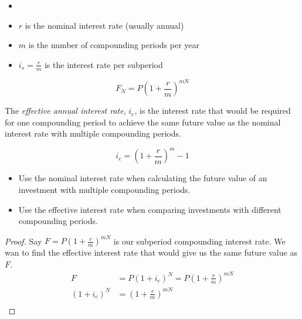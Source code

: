\begin{vocabulary}
    \begin{itemize}
        \item[]
        \item $r$ is the nominal interest rate (usually annual)
        \item $m$ is the number of compounding periods per year
        \item $i_s =\frac{r}{m}$ is the interest rate per subperiod
    \end{itemize}
\end{vocabulary}

\begin{theorem}
    \begin{equation}
        F_N = P(1 + \frac{r}{m})^{mN}
    \end{equation}
\end{theorem}

\begin{definition}
    The \textit{effective annual interest rate}, $i_e$, is the interest rate that would be required for one compounding period to achieve the same future value as the nominal interest rate with multiple compounding periods.
\end{definition}
\begin{claim}
    \begin{equation}
        i_e = (1 + \frac{r}{m})^m -1
    \end{equation}
\end{claim}


\begin{remark}
    \begin{itemize}
        \item Use the nominal interest rate when calculating the future value of an investment with multiple compounding periods.
        \item Use the effective interest rate when comparing investments with different compounding periods.
    \end{itemize}
\end{remark}

\begin{proof}
    Say $F = P(1 + \frac{r}{m})^{mN}$ is our subperiod compounding interest rate. We wan to find the effective interest rate that would give us the same future value as $F$.
    \begin{align}
        F           & = P(1 + i_e)^N = P(1 + \frac{r}{m})^{mN} \\
        (1 + i_e)^N & = (1 + \frac{r}{m})^{mN}                 \\
    \end{align}
\end{proof}

